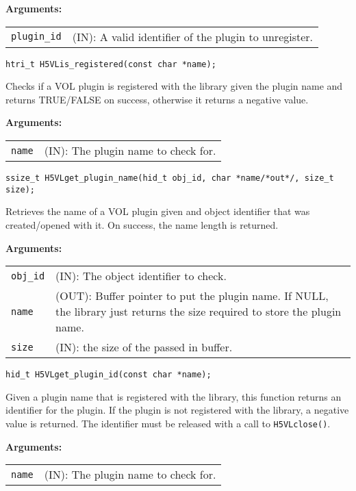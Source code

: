 \textbf{Arguments:}\\
\begin{tabular}{l p{10cm}}
  {\tt plugin\_id} & (IN): A valid identifier of the plugin to unregister.\\
\end{tabular}

\begin{lstlisting}
htri_t H5VLis_registered(const char *name);
\end{lstlisting}
Checks if a VOL plugin is registered with the library given the plugin name and returns TRUE/FALSE on success, otherwise it returns a negative value.

\textbf{Arguments:}\\
\begin{tabular}{l p{10cm}}
  {\tt name} & (IN): The plugin name to check for.\\
\end{tabular}

\begin{lstlisting}
ssize_t H5VLget_plugin_name(hid_t obj_id, char *name/*out*/, size_t size);
\end{lstlisting}
Retrieves the name of a VOL plugin given and object identifier that was created/opened with it. On success, the name length is returned.

\textbf{Arguments:}\\
\begin{tabular}{l p{10cm}}
  {\tt obj\_id} & (IN): The object identifier to check.\\
  {\tt name} & (OUT): Buffer pointer to put the plugin name. If NULL, the library just returns the size required to store the plugin name.\\
  {\tt size} & (IN): the size of the passed in buffer.\\
\end{tabular}

\begin{lstlisting}
hid_t H5VLget_plugin_id(const char *name);
\end{lstlisting}
Given a plugin name that is registered with the library, this function returns an identifier for the plugin. If the plugin is not registered with the library, a negative value is returned. The identifier must be released with a call to {\tt H5VLclose()}.

\textbf{Arguments:}\\
\begin{tabular}{l p{10cm}}
  {\tt name} & (IN): The plugin name to check for.\\
\end{tabular}


